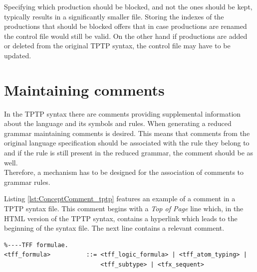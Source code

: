 Specifying which production should be blocked, and not the ones should be kept, typically results in a significantly smaller file.
Storing the indexes of the productions that should be blocked offers that in case productions are renamed the control file would still be valid. On the other hand if productions are added or deleted from the original \ac{TPTP} syntax, the control file may have to be updated.

\section{Maintaining comments}\label{sec:ConceptMaintainingComments}

In the \ac{TPTP} syntax there are comments providing supplemental information about the language and its symbols and rules.
When generating a reduced grammar maintaining comments is desired. This means that comments from the original language specification should be associated with the rule they belong to and if the rule is still present in the reduced grammar, the comment should be as well.\\
Therefore, a mechanism has to be designed for the association of comments to grammar rules.

Listing \ref{lst:ConceptComment_tptp} features an example of a comment in a \ac{TPTP} syntax file. This comment begins with a \textit{Top of Page} line which, in the HTML version of the \ac{TPTP} syntax, contains a hyperlink which leads to the beginning of the syntax file.
The next line contains a relevant comment.\\
\begin{lstlisting}[language=none, basicstyle=\scriptsize	,caption= Comment in the \ac{TPTP} syntax,label= lst:ConceptComment_tptp]
%----Top of Page---------------------------------------------------------------
%----TFF formulae.
<tff_formula>          ::= <tff_logic_formula> | <tff_atom_typing> |
                           <tff_subtype> | <tfx_sequent>
\end{lstlisting}

